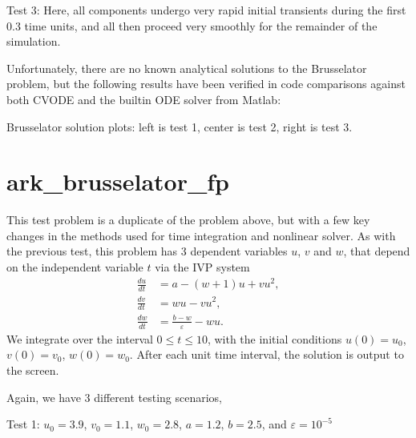 \documentclass[letterpaper,10pt,english]{sphinxmanual}
\begin{document}
\sphinxAtStartPar
Test 3: Here, all components undergo very rapid initial transients
during the first 0.3 time units, and all then proceed very smoothly
for the remainder of the simulation.

\sphinxAtStartPar
Unfortunately, there are no known analytical solutions to the
Brusselator problem, but the following results have been verified
in code comparisons against both CVODE and the built\sphinxhyphen{}in ODE solver
 from Matlab:

\noindent{}

\noindent{}

\noindent{}

\sphinxAtStartPar
Brusselator solution plots: left is test 1, center is test 2, right is
test 3.


\section{ark\_brusselator\_fp}
\label{\detokenize{c_serial:ark-brusselator-fp}}\label{\detokenize{c_serial:id8}}
\sphinxAtStartPar
This test problem is a duplicate of the  problem
above, but with a few key changes in the methods used for time
integration and nonlinear solver.  As with the previous test, this
problem has 3 dependent variables \(u\), \(v\) and \(w\),
that depend on the independent variable \(t\) via the IVP system
\begin{equation*}
\begin{split}\frac{du}{dt} &= a - (w+1)u + v u^2, \\
\frac{dv}{dt} &= w u - v u^2, \\
\frac{dw}{dt} &= \frac{b-w}{\varepsilon} - w u.\end{split}
\end{equation*}
\sphinxAtStartPar
We integrate over the interval \(0 \le t \le 10\), with the
initial conditions \(u(0) = u_0\), \(v(0) = v_0\),
\(w(0) = w_0\).  After each unit time interval, the solution is
output to the screen.

\sphinxAtStartPar
Again, we have 3 different testing scenarios,

\sphinxAtStartPar
Test 1:  \(u_0=3.9\),  \(v_0=1.1\),  \(w_0=2.8\),
\(a=1.2\), \(b=2.5\), and \(\varepsilon=10^{-5}\)
\end{document}
